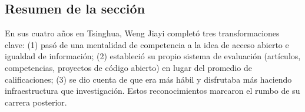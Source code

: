 \subsection{Resumen de la sección}

En sus cuatro años en Tsinghua, Weng Jiayi completó tres transformaciones clave: (1) pasó de una mentalidad de competencia a la idea de acceso abierto e igualdad de información; (2) estableció su propio sistema de evaluación (artículos, competencias, proyectos de código abierto) en lugar del promedio de calificaciones; (3) se dio cuenta de que era más hábil y disfrutaba más haciendo infraestructura que investigación. Estos reconocimientos marcaron el rumbo de su carrera posterior.
